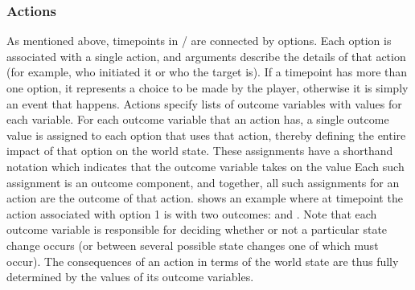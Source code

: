 \subsubsection{Actions}

As mentioned above, timepoints in \dunyazad/ are connected by options.
%
Each option is associated with a single action, and arguments describe the details of that action (for example, who initiated it or who the target is).
%
If a timepoint has more than one option, it represents a choice to be made by the player, otherwise it is simply an event that happens.
%
Actions specify lists of outcome variables with values for each variable.
%
For each outcome variable that an action has, a single outcome value is assigned to each option that uses that action, thereby defining the entire impact of that option on the world state.
%
These assignments have a shorthand notation  which indicates that the outcome variable  takes on the value 
%
Each such assignment is an outcome component, and together, all such assignments for an action are the outcome of that action.
%
 shows an example where at timepoint  the action associated with option 1 is  with two outcomes:  and .
%
Note that each outcome variable is responsible for deciding whether or not a particular state change occurs (or between several possible state changes one of which must occur).
%
The consequences of an action in terms of the world state are thus fully determined by the values of its outcome variables.

